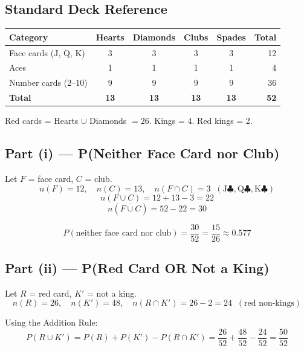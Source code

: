\documentclass[12pt]{article}
\newcommand{\hcell}[1]{\textbf{\color{white}#1}}
\begin{document}
\subsection*{Standard Deck Reference}

{\small
\begin{center}
\begin{tabular}{lccccr}
\toprule
\rowcolor{primary}
\hcell{Category} & \hcell{Hearts} & \hcell{Diamonds} & \hcell{Clubs} & \hcell{Spades} & \hcell{Total} \\
\midrule
\rowcolor{lightbg!40}
Face cards (J, Q, K) & 3 & 3 & 3 & 3 & 12 \\
Aces & 1 & 1 & 1 & 1 & 4 \\
\rowcolor{lightbg!40}
Number cards (2--10) & 9 & 9 & 9 & 9 & 36 \\
\midrule
\rowcolor{primary}
\hcell{Total} & \hcell{13} & \hcell{13} & \hcell{13} & \hcell{13} & \hcell{52} \\
\bottomrule
\end{tabular}
\end{center}
}

\vspace{8pt}
Red cards = Hearts $\cup$ Diamonds $= 26$. \quad
Kings = 4. \quad Red kings = 2.

\subsection*{Part (i) --- P(Neither Face Card nor Club)}

Let $F$ = face card, $C$ = club.
\[
  n(F) = 12, \quad n(C) = 13, \quad n(F \cap C) = 3 \;\;(\text{J}\clubsuit,\text{Q}\clubsuit,\text{K}\clubsuit)
\]
\[
  n(F \cup C) = 12 + 13 - 3 = 22
\]
\[
  n(\overline{F \cup C}) = 52 - 22 = 30
\]

\begin{answerbox}
\[
  P(\text{neither face card nor club}) = \frac{30}{52} = \frac{15}{26} \approx \mathbf{0.577}
\]
\end{answerbox}

\subsection*{Part (ii) --- P(Red Card OR Not a King)}

Let $R$ = red card, $K'$ = not a king.
\[
  n(R) = 26, \quad n(K') = 48, \quad n(R \cap K') = 26 - 2 = 24 \;\;(\text{red non-kings})
\]

Using the Addition Rule:
\[
  P(R \cup K') = P(R) + P(K') - P(R \cap K') = \frac{26}{52} + \frac{48}{52} - \frac{24}{52} = \frac{50}{52}
\]
\end{document}
